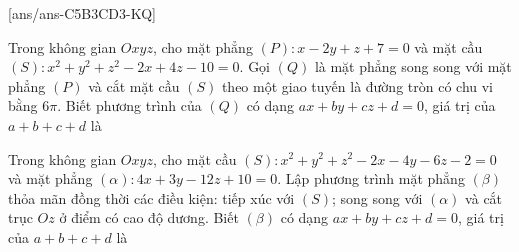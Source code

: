 [ans/ans-C5B3CD3-KQ]
\TNSA
\begin{ex}%
	Trong không gian $Oxyz$, cho mặt phẳng $(P)\colon x-2y+z+7=0$ và mặt cầu $(S)\colon x^2+y^2+z^2-2x+4z-10=0$. Gọi $(Q)$ là mặt phẳng song song với mặt phẳng $(P)$ và cắt mặt cầu $(S)$ theo một giao tuyến là đường tròn có chu vi bằng $6\pi$. Biết phương trình của $(Q)$ có dạng $ax+by+cz+d=0$, giá trị của $a+b+c+d$ là
\end{ex}
\begin{ex}%
	Trong không gian $Oxyz$, cho mặt cầu $(S)\colon x^2+y^2+z^2-2x-4y-6z-2=0$ và mặt phẳng $(\alpha)\colon 4x+3y-12z+10=0$. Lập phương trình mặt phẳng $(\beta)$ thỏa mãn đồng thời các điều kiện: tiếp xúc với $(S)$; song song với $(\alpha)$ và cắt trục $Oz$ ở điểm có cao độ dương. Biết $(\beta)$ có dạng $ax+by+cz+d=0$, giá trị của $a+b+c+d$ là
\end{ex}

